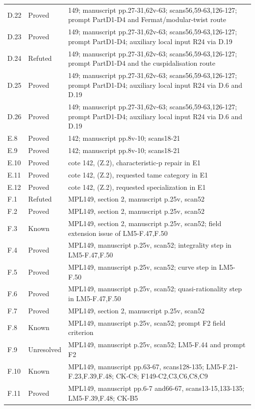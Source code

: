 {\begin{longtable}{p{1.9cm}p{1.7cm}p{10.3cm}}
D.22 & Proved & 149; manuscript pp.27-31,62v-63; scans56,59-63,126-127; prompt PartD1-D4 and Fermat/modular-twist route \\
D.23 & Proved & 149; manuscript pp.27-31,62v-63; scans56,59-63,126-127; prompt PartD1-D4; auxiliary local input R24 via D.19 \\
D.24 & Refuted & 149; manuscript pp.27-31,62v-63; scans56,59-63,126-127; prompt PartD1-D4 and the cuspidalisation route \\
D.25 & Proved & 149; manuscript pp.27-31,62v-63; scans56,59-63,126-127; prompt PartD1-D4; auxiliary local input R24 via D.6 and D.19 \\
D.26 & Proved & 149; manuscript pp.27-31,62v-63; scans56,59-63,126-127; prompt PartD1-D4; auxiliary local input R24 via D.6 and D.19 \\
E.8 & Proved & 142; manuscript pp.8v-10; scans18-21 \\
E.9 & Proved & 142; manuscript pp.8v-10; scans18-21 \\
E.10 & Proved & cote 142, (Z.2), characteristic-p repair in E1 \\
E.11 & Proved & cote 142, (Z.2), requested tame category in E1 \\
E.12 & Proved & cote 142, (Z.2), requested specialization in E1 \\
F.1 & Refuted & MPL149, section 2, manuscript p.25v, scan52 \\
F.2 & Proved & MPL149, section 2, manuscript p.25v, scan52 \\
F.3 & Known & MPL149, section 2, manuscript p.25v, scan52; field extension issue of LM5-F.47,F.50 \\
F.4 & Proved & MPL149, manuscript p.25v, scan52; integrality step in LM5-F.47,F.50 \\
F.5 & Proved & MPL149, manuscript p.25v, scan52; curve step in LM5-F.50 \\
F.6 & Proved & MPL149, manuscript p.25v, scan52; quasi-rationality step in LM5-F.47,F.50 \\
F.7 & Proved & MPL149, section 2, manuscript p.25v, scan52 \\
F.8 & Known & MPL149, manuscript p.25v, scan52; prompt F2 field criterion \\
F.9 & Unresolved & MPL149, manuscript p.25v, scan52; LM5-F.44 and prompt F2 \\
F.10 & Known & MPL149, manuscript pp.63-67, scans128-135; LM5-F.21-F.23,F.39,F.48; CK-C8; F149-C2,C3,C6,C8,C9 \\
F.11 & Proved & MPL149, manuscript pp.6-7 and66-67, scans13-15,133-135; LM5-F.39,F.48; CK-B5 \\

\end{longtable}}
